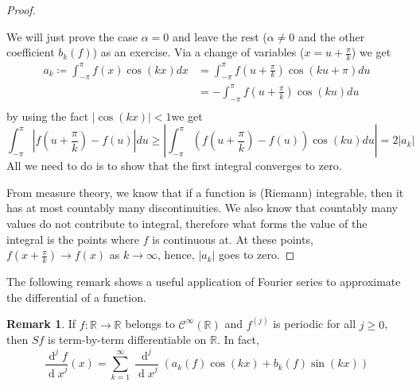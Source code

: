 \documentclass[12pt]{amsart}
\theoremstyle{definition}
\newtheorem{remark}[theorem]{Remark}
\newcommand{\RR}{{\mathbb R}} %
\newcommand{\cC}{{\mathcal C}}
\newcommand{\de}{\operatorname{d}} %
\begin{document}
\begin{proof}\cite{Measure}\footnotemark{}



    We will just prove the case $\alpha = 0$ and leave the rest ($\alpha \neq 0$ and the other coefficient $b_k(f)$) as an exercise. Via a change of variables ($x = u + \frac{\pi}{k}$) we get
%
    \[
    \begin{aligned}
        a_k \coloneqq \int_{-\pi}^{\pi}f(x)\cos(kx) dx &= \int_{-\pi}^{\pi}f(u + \frac{\pi}{k})\cos(ku + \pi) du\\
        &= - \int_{-\pi}^{\pi}f(u + \frac{\pi}{k})\cos(ku) du\\
        \end{aligned}
    \]
        by using the fact $|\cos(kx)| < 1$we get
    \[
        \int_{-\pi}^{\pi}|f(u + \frac{\pi}{k}) - f(u)|du \geq \left|\int_{-\pi}^{\pi}(f(u + \frac{\pi}{k}) - f(u))\cos(ku)du\right| = 2|a_k|
    \]
All we need to do is to show that the first integral converges to zero.\footnotemark{}




From measure theory, we know that if a function is (Riemann) integrable, then it has at most countably many discontinuities. We also know that countably many values do not contribute to integral, therefore what forms the value of the integral is the points where $f$ is continuous at. At these points, $f(x + \frac{\pi}{k}) \to f(x)$ as $k \to \infty$, hence, $|a_k|$ goes to zero.




\end{proof}


The following remark shows a useful application of Fourier series to approximate the differential of a function.


\begin{remark}
    If $f: \RR \to \RR$ belongs to $\cC^\infty(\RR)$ and $f^{(j)}$ is periodic for all $j \geq 0$, then $Sf$ is term-by-term differentiable on $\RR$. In fact,
\[
\frac{\de ^jf}{{\de x}^j}(x) = \sum_{k = 1}^{\infty} \frac{\de ^j}{{\de x}^j}(a_k(f)\cos(kx) + b_k(f)\sin(kx))
\]
\end{remark}
\end{document}
